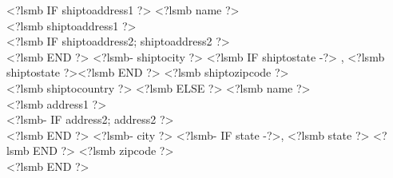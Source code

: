 \documentclass{scrartcl}
\begin{document}
<?lsmb IF shiptoaddress1 ?>
\noindent <?lsmb name ?>\\
<?lsmb shiptoaddress1 ?>\\
<?lsmb IF shiptoaddress2; shiptoaddress2 ?>\\ <?lsmb END ?>
<?lsmb- shiptocity ?>
<?lsmb IF shiptostate -?>
\hspace{-0.1cm}, <?lsmb shiptostate ?><?lsmb END ?> <?lsmb shiptozipcode ?>\\
<?lsmb shiptocountry ?>
<?lsmb ELSE ?>
\noindent <?lsmb name ?>\\
<?lsmb address1 ?> \\
<?lsmb- IF address2; address2 ?> \\<?lsmb END ?>
<?lsmb- city ?>
<?lsmb- IF state -?>, <?lsmb state ?> <?lsmb END ?> <?lsmb zipcode ?>\\
<?lsmb END ?>
\end{document}

